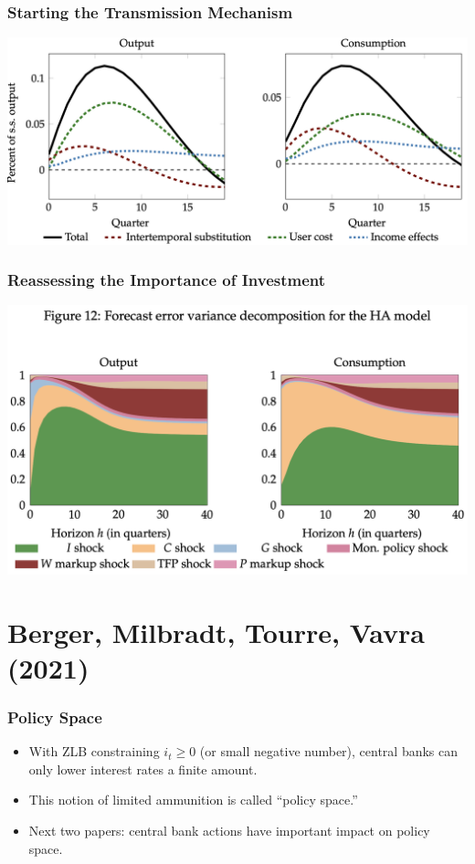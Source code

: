 \documentclass[english,xcolor=svgnames]{beamer}
\begin{document}
\begin{frame}
    \frametitle{Starting the Transmission Mechanism}
    \begin{center}
    	\includegraphics[scale=0.3]{figures/ARSFIG8.png}	
    \end{center}
\end{frame}


\begin{frame}
    \frametitle{Reassessing the Importance of Investment}
    \begin{center}
    	\includegraphics[scale=0.3]{figures/ARSFIG12.png}	
    \end{center}
\end{frame}




\section{Berger, Milbradt, Tourre, Vavra (2021)}



\begin{frame}
    \frametitle{Policy Space}
    \begin{itemize}
    	\item With ZLB constraining $i_t \ge 0$ (or small negative number), central banks can only lower interest rates a finite amount.
    	\item This notion of limited ammunition is called ``policy space.''
    	\item Next two papers: central bank actions have important impact on policy space.
    \end{itemize}
\end{frame}
\end{document}
